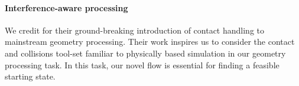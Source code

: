 \paragraph{Interference-aware processing} We credit
\cite{ContactAwareModeling:2011} for their ground-breaking introduction of
contact handling to mainstream geometry processing. Their work inspires us to
consider the contact and collisions tool-set familiar to physically based
simulation in our geometry processing task.
%
In this task, our novel flow is essential for finding a feasible starting
state.

